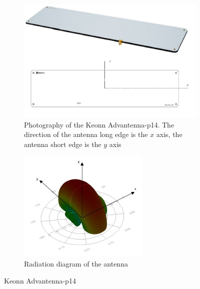 \begin{figure}
    \centering
    \begin{subfigure}{.45\textwidth}
        \centering
        \includegraphics[width=\linewidth]{./figs/advantennap14.pdf}
        \caption{Photography of the Keonn Advantenna-p14. The direction of the antenna long edge is the $x$ axis, the antenna short edge is the $y$ axis} 
        \label{fig:advantennap14}
    \end{subfigure}
    \begin{subfigure}{.45\textwidth}
        \centering
        \includegraphics[width=\linewidth]{./figs/advantennap14-radiation.pdf}
        \caption{Radiation diagram of the antenna} 
        \label{fig:advantennap14-radiation}
    \end{subfigure}
    \caption{Keonn Advantenna-p14~\cite{Advantennap14RFIDCompact}} 
    \label{fig:antennachoice}
\end{figure}

